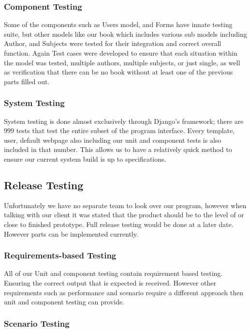 \documentclass[11pt]{article}
\begin{document}
		\subsubsection{Component Testing}

			Some of the components such as Users model, and Forms have innate testing suite, but other models like our book which includes various sub models including Author, and Subjects were tested for their integration and correct overall function. 
			Again Test cases were developed to ensure that each situation within the model was tested, multiple authors, multiple subjects, or just single, as well as verification that there can be no book without at least one of the previous parts filled out.

		\subsubsection{System Testing}

			System testing is done almost exclusively through Django's framework; there are 999 tests that test the entire subset of the program interface. 
			Every template, user, default webpage also including our unit and component tests is also included in that number. 
			This allows us to have a relatively quick method to ensure our current system build is up to specifications.

	\subsection{Release Testing}

		Unfortunately we have no separate team to look over our program, however when talking with our client it was stated that the product should be to the level of or close to finished prototype. 
		Full release testing would be done at a later date. 
		However parts can be implemented currently. 

		\subsubsection{Requirements-based Testing}

			All of our Unit and component testing contain requirement based testing. 
			Ensuring the correct output that is expected is received. 
			However other requirements such as performance and scenario require a different approach then unit and component testing can provide.

		\subsubsection{Scenario Testing}
\end{document}
